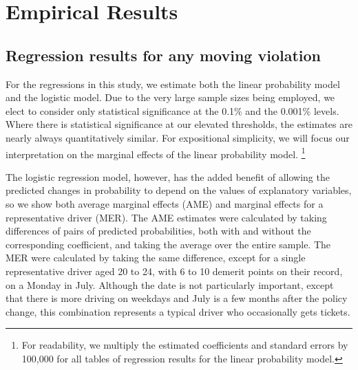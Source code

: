 \section{Empirical Results}
\label{sec:Empirical}


\subsection{Regression results for any moving violation}
\label{sec:Empirical_all}

For the regressions in this study, we estimate both the linear probability model and the logistic model. 
%
Due to the very large sample sizes being employed, 
we elect to consider only statistical significance at the 0.1\% and the 0.001\% levels. 
%
Where there is statistical significance at our elevated thresholds, 
the estimates are nearly always quantitatively similar. 
For expositional simplicity, we will focus our interpretation on 
the marginal effects of the linear probability model.%
\footnote{%
For readability, we multiply the estimated coefficients and standard errors by 100,000 
for all tables of regression results for the linear probability model.
% 
}






The logistic regression model, however, has the added benefit of 
allowing the predicted changes in probability to depend on
the values of explanatory variables, 
so we show both average marginal effects (AME)
and marginal effects for a representative driver (MER). 
% 
The AME estimates were calculated by taking differences of pairs of 
predicted probabilities, both with and without the corresponding coefficient,
and taking the average over the entire sample. 
%
The MER were calculated by taking the same difference, 
except for a single representative driver aged 20 to 24, 
with 6 to 10 demerit points on their record, 
on a Monday in July. 
Although the date is not particularly important, 
except that there is more driving on weekdays 
and July is a few months after the policy change, 
this combination represents a typical driver who occasionally
gets tickets. 



